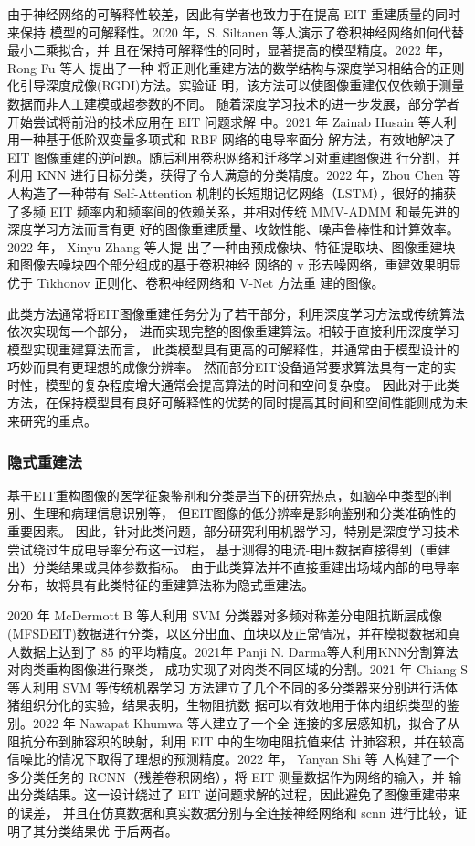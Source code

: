 由于神经网络的可解释性较差，因此有学者也致力于在提高 EIT 重建质量的同时来保持
模型的可解释性。2020 年，S. Siltanen 等人演示了卷积神经网络如何代替最小二乘拟合，并
且在保持可解释性的同时，显著提高的模型精度\cite{9231717}。2022 年，Rong Fu 等人 提出了一种
将正则化重建方法的数学结构与深度学习相结合的正则化引导深度成像(RGDI)方法。实验证
明，该方法可以使图像重建仅仅依赖于测量数据而非人工建模或超参数的不同\cite{9739002}。
随着深度学习技术的进一步发展，部分学者开始尝试将前沿的技术应用在 EIT 问题求解
中。2021 年 Zainab Husain 等人利用一种基于低阶双变量多项式和 RBF 网络的电导率面分
解方法，有效地解决了 EIT 图像重建的逆问题。随后利用卷积网络和迁移学习对重建图像进
行分割，并利用 KNN 进行目标分类，获得了令人满意的分类精度\cite{9336698}。2022 年，Zhou Chen
等人构造了一种带有 Self-Attention 机制的长短期记忆网络（LSTM），很好的捕获了多频 EIT
频率内和频率间的依赖关系，并相对传统 MMV-ADMM 和最先进的深度学习方法而言有更
好的图像重建质量、收敛性能、噪声鲁棒性和计算效率\cite{9732193}。2022 年， Xinyu Zhang 等人提
出了一种由预成像块、特征提取块、图像重建块和图像去噪块四个部分组成的基于卷积神经
网络的 v 形去噪网络，重建效果明显优于 Tikhonov 正则化、卷积神经网络和 V-Net 方法重
建的图像\cite{9754540}。

此类方法通常将EIT图像重建任务分为了若干部分，利用深度学习方法或传统算法依次实现每一个部分，
进而实现完整的图像重建算法。相较于直接利用深度学习模型实现重建算法而言，
此类模型具有更高的可解释性，并通常由于模型设计的巧妙而具有更理想的成像分辨率。
然而部分EIT设备通常要求算法具有一定的实时性，模型的复杂程度增大通常会提高算法的时间和空间复杂度。
因此对于此类方法，在保持模型具有良好可解释性的优势的同时提高其时间和空间性能则成为未来研究的重点。

\subsubsection{隐式重建法}
基于EIT重构图像的医学征象鉴别和分类是当下的研究热点，如脑卒中类型的判别、生理和病理信息识别等，
但EIT图像的低分辨率是影响鉴别和分类准确性的重要因素。
因此，针对此类问题，部分研究利用机器学习，特别是深度学习技术尝试绕过生成电导率分布这一过程，
基于测得的电流-电压数据直接得到（重建出）分类结果或具体参数指标。
由于此类算法并不直接重建出场域内部的电导率分布，故将具有此类特征的重建算法称为隐式重建法。 

2020 年 McDermott B 等人利用 SVM 分类器对多频对称差分电阻抗断层成像(MFSDEIT)数据进行分类，以区分出血、血块以及正常情况，并在模拟数据和真人数据上达到了 85%
的平均精度\cite{article1234568}。2021年 Panji N. Darma等人利用KNN分割算法对肉类重构图像进行聚类，
成功实现了对肉类不同区域的分割\cite{9625686}。2021 年 Chiang S 等人利用 SVM 等传统机器学习
方法建立了几个不同的多分类器来分别进行活体猪组织分化的实验，结果表明，生物阻抗数
据可以有效地用于体内组织类型的鉴别\cite{app9194049}。2022 年 Nawapat Khumwa 等人建立了一个全
连接的多层感知机，拟合了从阻抗分布到肺容积的映射，利用 EIT 中的生物电阻抗值来估
计肺容积，并在较高信噪比的情况下取得了理想的预测精度\cite{9741619}。2022 年， Yanyan Shi 等
人构建了一个多分类任务的 RCNN（残差卷积网络），将 EIT 测量数据作为网络的输入，并
输出分类结果。这一设计绕过了 EIT 逆问题求解的过程，因此避免了图像重建带来的误差，
并且在仿真数据和真实数据分别与全连接神经网络和 scnn 进行比较，证明了其分类结果优
于后两者\cite{9751762}。

